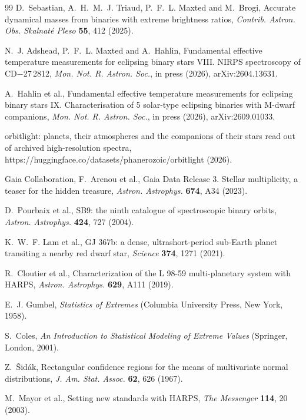 \documentclass[3p,11pt]{elsarticle}
\begin{document}
\begin{thebibliography}{99}
D.~Sebastian, A.~H.~M.~J. Triaud, P.~F.~L. Maxted and M.~Brogi, Accurate dynamical masses from
binaries with extreme brightness ratios, \emph{Contrib. Astron. Obs. Skalnat\'e Pleso}
\textbf{55}, 412 (2025).

N.~J. Adshead, P.~F.~L. Maxted and A.~Hahlin, Fundamental effective temperature measurements for
eclipsing binary stars VIII. NIRPS spectroscopy of CD$-$27\,2812, \emph{Mon. Not. R. Astron.
Soc.}, in press (2026), arXiv:2604.13631.

A.~Hahlin et al., Fundamental effective temperature measurements for eclipsing binary stars IX.
Characterisation of 5 solar-type eclipsing binaries with M-dwarf companions, \emph{Mon. Not. R.
Astron. Soc.}, in press (2026), arXiv:2609.01033.

orbitlight: planets, their atmospheres and the companions of their stars read out of archived
high-resolution spectra, https://huggingface.co/datasets/phanerozoic/orbitlight (2026).

Gaia Collaboration, F.~Arenou et al., Gaia Data Release 3. Stellar multiplicity, a teaser for the
hidden treasure, \emph{Astron. Astrophys.} \textbf{674}, A34 (2023).

D.~Pourbaix et al., SB9: the ninth catalogue of spectroscopic binary orbits, \emph{Astron.
Astrophys.} \textbf{424}, 727 (2004).

K.~W.~F. Lam et al., GJ 367b: a dense, ultrashort-period sub-Earth planet transiting a nearby
red dwarf star, \emph{Science} \textbf{374}, 1271 (2021).

R.~Cloutier et al., Characterization of the L 98-59 multi-planetary system with HARPS,
\emph{Astron. Astrophys.} \textbf{629}, A111 (2019).

E.~J. Gumbel, \emph{Statistics of Extremes} (Columbia University Press, New York, 1958).

S.~Coles, \emph{An Introduction to Statistical Modeling of Extreme Values} (Springer, London,
2001).

Z.~\v{S}id\'ak, Rectangular confidence regions for the means of multivariate normal
distributions, \emph{J. Am. Stat. Assoc.} \textbf{62}, 626 (1967).

M.~Mayor et al., Setting new standards with HARPS, \emph{The Messenger} \textbf{114}, 20 (2003).


\end{thebibliography}
\end{document}
